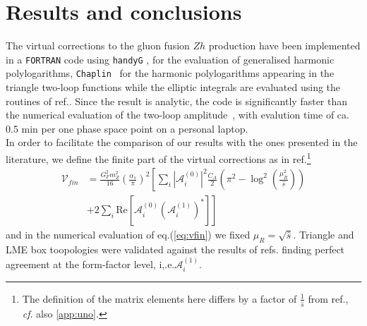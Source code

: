 \section{Results and conclusions} \label{sec:hzres}
The virtual corrections to the gluon fusion $Zh$ production have been implemented in a  \texttt{FORTRAN} code using  \texttt{handyG} \cite{Naterop:2019xaf}, for the evaluation of generalised harmonic polylogarithms, \texttt{Chaplin}~\cite{Buehler:2011ev} for the harmonic polylogarithms appearing in the triangle two-loop functions  while 
the elliptic integrals are evaluated using the routines of
ref.\cite{Bonciani:2018uvv}. Since the result is analytic, the code is significantly faster than the numerical evaluation of the two-loop amplitude~\cite{Chen:2020gae}, with evalution time of ca. 0.5 min per one phase space point on a personal laptop.\\
In order to facilitate the comparison of our results with the ones
presented in the literature, we define the finite part of the virtual corrections
as in
ref.\cite{Davies:2020drs}\footnote{The definition of the matrix elements here
	differs by a factor of
	$\frac{1}{\hat{s}}$ from ref.\cite{Davies:2020drs}, \textit{cf}. also
	 \autoref{app:uno}.}
\begin{equation}
	\begin{split}
		\mathcal{V}_{fin}&=\frac{G_F^2 m_Z^2}{16}\left(\frac{\alpha_s}{\pi}\right)^2
		\left[ \sum_{i} \left|\mathcal{A}_i^{(0)} \right|^2\frac{C_A}{2}\left(\pi^2-
		\log^2\left(\frac{\mu_R^2}{\hat{s}}\right)\right)\right. \\
		& \left. +2\sum_i\text{Re}\left[\mathcal{A}_i^{(0)}\left(\mathcal{A}_i^{(1)}\right)^*\right]\right]\,
		\label{eq:vfin}
	\end{split}
\end{equation}
and in the numerical evaluation of eq.(\ref{eq:vfin}) we fixed
$\mu_R= \sqrt{\hat{s}}$.
Triangle and LME box toopologies were validated against the results of refs.\cite{Hasselhuhn:2016rqt,Davies:2020drs} finding perfect
agreement at the form-factor level, i,.e.$\mathcal{A}_i^{(1)}$. 

